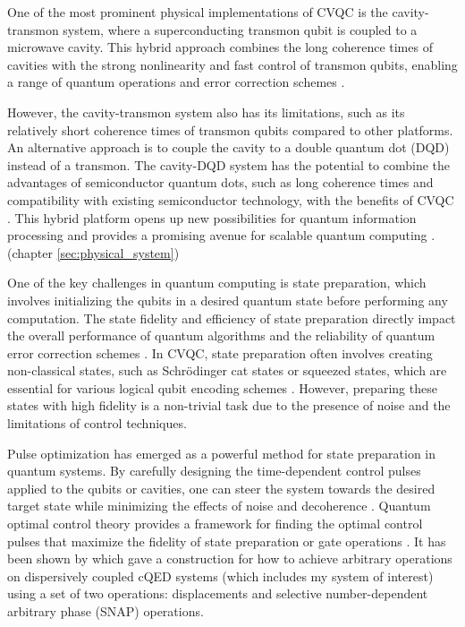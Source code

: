 \documentclass[12pt]{report}
\begin{document}
One of the most prominent physical implementations of CVQC is the cavity-transmon system, where a superconducting transmon qubit is coupled to a microwave cavity. This hybrid approach combines the long coherence times of cavities with the strong nonlinearity and fast control of transmon qubits, enabling a range of quantum operations and error correction schemes \cite{Ofek2016}.
\par
However, the cavity-transmon system also has its limitations, such as its relatively short coherence times of transmon qubits compared to other platforms. 
An alternative approach is to couple the cavity to a double quantum dot (DQD) instead of a transmon. 
The cavity-DQD system has the potential to combine the advantages of semiconductor quantum dots, such as long coherence times and compatibility with existing semiconductor technology, with the benefits of CVQC \cite{Mi2018}. 
This hybrid platform opens up new possibilities for quantum information processing and provides a promising avenue for scalable quantum computing \cite{Burkard2020}. (chapter \ref{sec:physical_system})
\par
One of the key challenges in quantum computing is state preparation, which involves initializing the qubits in a desired quantum state before performing any computation. 
The state fidelity and efficiency of state preparation directly impact the overall performance of quantum algorithms and the reliability of quantum error correction schemes \cite{Shen2017}. 
In CVQC, state preparation often involves creating non-classical states, such as Schrödinger cat states or squeezed states, which are essential for various logical qubit encoding schemes \cite{Joshi_2021}. 
However, preparing these states with high fidelity is a non-trivial task due to the presence of noise and the limitations of control techniques.
\par
Pulse optimization has emerged as a powerful method for state preparation in quantum systems. 
By carefully designing the time-dependent control pulses applied to the qubits or cavities, one can steer the system towards the desired target state while minimizing the effects of noise and decoherence \cite{Khaneja2005}. 
Quantum optimal control theory provides a framework for finding the optimal control pulses that maximize the fidelity of state preparation or gate operations \cite{Glaser2015}. 
It has been shown by \cite{Krastanov2015} which gave a construction for how to achieve arbitrary operations on dispersively coupled cQED systems (which includes my system of interest) using a set of two operations: displacements and selective number-dependent arbitrary phase (SNAP) operations.
\end{document}
